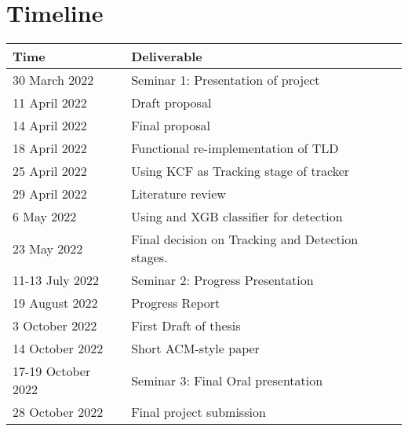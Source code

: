 \section{Timeline}
\begin{center}
  \begin{tabular}{l l}
    \toprule
      Time & Deliverable\\
    \midrule
      30 March 2022     & Seminar 1: Presentation of project\\
      11 April 2022     & Draft proposal\\
      14 April 2022     & Final proposal\\
      18 April 2022     & Functional re-implementation of TLD\\
      25 April 2022     & Using KCF as Tracking stage of tracker\\
      29 April 2022     & Literature review\\
      6 May 2022        & Using and XGB classifier for detection\\
      23 May 2022       & Final decision on Tracking and Detection stages.\\
      11-13 July 2022   & Seminar 2: Progress Presentation\\
      19 August 2022    & Progress Report\\
      3 October 2022    & First Draft of thesis\\
      14 October 2022   & Short ACM-style paper\\
      17-19 October 2022& Seminar 3: Final Oral presentation\\
      28 October 2022   & Final project submission\\
    \bottomrule
  \end{tabular}
\end{center}
